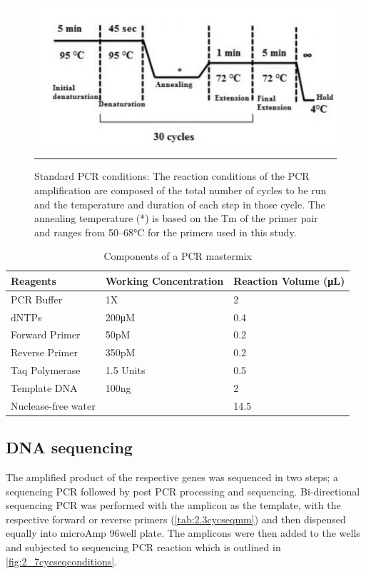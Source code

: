 \begin{refsection}
\begin{figure}[!tb]
\centering
\includegraphics[width=\linewidth]{Figures/2_6pcrconditions.pdf} 
\rule{35em}{0.5pt}
\caption{Standard PCR conditions: The reaction conditions of the PCR amplification are composed of the total number of cycles to be run and the temperature and duration of each step in those cycle. The annealing temperature (*) is based on the Tm of the primer pair and ranges from 50–68°C for the primers used in this study. \cite{Cabuk2007, deeparani2009detection, galbiatti20105, zeng2011a66g, goldmuntz2001nkx2}}
\label{fig:2_6pcrconditions}
\end{figure}

\begin{table}[!h]
\centering
\caption{Components of a PCR mastermix}
\label{tab:2.2pcrmm}
\begin{tabular}{  l  l  l  }
\hline
	Reagents & Working Concentration & Reaction Volume (μL) \\ \hline
	PCR Buffer & 1X & 2 \\ \hline
	dNTPs & 200μM & 0.4 \\ \hline
	Forward Primer & 50pM & 0.2 \\ \hline
	Reverse Primer & 350pM & 0.2 \\ \hline
	Taq Polymerase & 1.5 Units & 0.5 \\ \hline
	Template DNA & 100ng & 2 \\ \hline
	Nuclease-free water &  & 14.5 \\ \hline
\end{tabular}
\end{table}

\subsection{DNA sequencing} 
The amplified product of the respective genes was sequenced in two steps; a sequencing PCR followed by post PCR processing and sequencing.  Bi-directional sequencing PCR was performed with the amplicon as the template, with the respective forward or reverse primers (\cref{tab:2.3cycseqmm}) and then dispensed equally into microAmp 96well plate. The amplicons were then added to the wells and subjected to sequencing PCR reaction which is outlined in \cref{fig:2_7cycseqconditions}.


\end{refsection}
